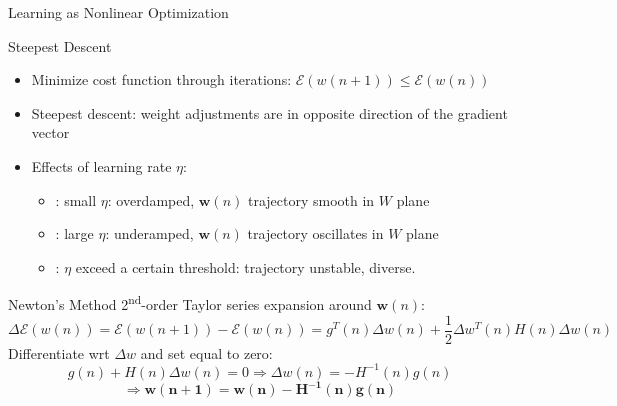 \documentclass[9pt,t]{beamer}
\begin{document}
\begin{frame}{Learning as Nonlinear Optimization}
    \begin{alertblock}{Steepest Descent}
        \begin{itemize}
            \item Minimize cost function through iterations: $ \mathcal{E}(w(n+1)) \leq \mathcal{E}(w(n)) $
            \item Steepest descent: weight adjustments are in opposite direction of the gradient vector
            \item Effects of learning rate $ \eta $:
            \begin{itemize}
                \item: small $ \eta $: overdamped, $ \mathbf{w}(n) $ trajectory smooth in $ W $ plane
                \item: large $ \eta $: underamped, $ \mathbf{w}(n) $ trajectory oscillates in $ W $ plane
                \item: $ \eta $ exceed a certain threshold: trajectory unstable, diverse.
            \end{itemize}
        \end{itemize}
    \end{alertblock}
    \begin{alertblock}{Newton's Method}
        2\textsuperscript{nd}-order Taylor series expansion around $ \mathbf{w}(n) $:
        \[ \Delta \mathbf{\mathcal{E}}(w(n)) = \mathbf{\mathcal{E}}(w(n+1)) - \mathbf{\mathcal{E}}(w(n)) = g^T(n)\Delta w(n) + \frac{1}{2} \Delta w^T(n) H(n) \Delta w(n) \]
        Differentiate wrt $ \Delta w $ and set equal to zero:
        \[ g(n) + H(n)\Delta w(n) = 0 \Rightarrow \Delta w(n) = - H^{-1}(n)g(n) \]
        \[ \Rightarrow \mathbf{w(n+1) = w(n) - H^{-1}(n)g(n)} \]
    \end{alertblock}
\end{frame}
\end{document}
